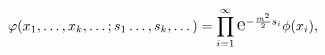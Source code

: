 \begin{equation}
   \varphi(x_1,\dots,x_k,\dots;s_1\dots,s_k,\dots)=\prod
   _{i=1}^{\infty}\text{\Large e}^{-\frac{m^2}{2}s_i}\phi(x_i),
   \end{equation}

